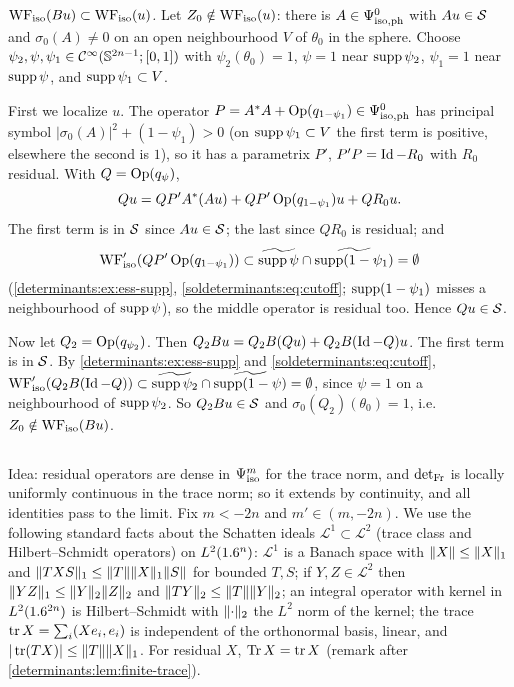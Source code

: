 \emph{$\operatorname{WF}_{\mathrm{iso}}(Bu)\subset\operatorname{WF}_{\mathrm{iso}}(u)$.} Let $Z_0\notin\operatorname{WF}_{\mathrm{iso}}(u)$: there is $A\in\Psi^{0}_{\mathrm{iso,ph}}$ with $Au\in\mathcal{S}$ and
$\sigma_0(A)\ne0$ on an open neighbourhood $V$ of $\theta_0$ in the sphere. Choose
$\psi_2,\psi,\psi_1\in\mathcal{C}^\infty(\mathbb{S}^{2n-1};[0,1])$ with $\psi_2(\theta_0)=1$, $\psi=1$ near $\operatorname{supp}\psi_2$,
$\psi_1=1$ near $\operatorname{supp}\psi$, and $\operatorname{supp}\psi_1\subset V$.

First we localize $u$. The operator $P=A^*A+\operatorname{Op}(q_{1-\psi_1})\in\Psi^{0}_{\mathrm{iso,ph}}$ has principal symbol
$|\sigma_0(A)|^2+(1-\psi_1)>0$ (on $\operatorname{supp}\psi_1\subset V$ the first term is positive, elsewhere the second is
$1$), so it has a parametrix $P'$, $P'P=\operatorname{Id}-R_0$ with $R_0$ residual. With $Q=\operatorname{Op}(q_\psi)$,
\begin{equation*}
  Qu=QP'A^*(Au)+QP'\operatorname{Op}(q_{1-\psi_1})u+QR_0u .
\end{equation*}
The first term is in $\mathcal{S}$ since $Au\in\mathcal{S}$; the last since $QR_0$ is residual; and
\begin{equation*}
  \operatorname{WF}_{\mathrm{iso}}'(QP'\operatorname{Op}(q_{1-\psi_1}))\subset\widetilde{\operatorname{supp}\psi}\cap\widetilde{\operatorname{supp}(1-\psi_1)}=\emptyset
\end{equation*}
(\cref{determinants:ex:ess-supp}, \eqref{soldeterminants:eq:cutoff}; $\operatorname{supp}(1-\psi_1)$ misses a neighbourhood of
$\operatorname{supp}\psi$), so the middle operator is residual too. Hence $Qu\in\mathcal{S}$.

Now let $Q_2=\operatorname{Op}(q_{\psi_2})$. Then $Q_2Bu=Q_2B(Qu)+Q_2B(\operatorname{Id}-Q)u$. The first term is in $\mathcal{S}$. By
\cref{determinants:ex:ess-supp} and \eqref{soldeterminants:eq:cutoff},
$\operatorname{WF}_{\mathrm{iso}}'(Q_2B(\operatorname{Id}-Q))\subset\widetilde{\operatorname{supp}\psi_2}\cap\widetilde{\operatorname{supp}(1-\psi)}=\emptyset$, since $\psi=1$
on a neighbourhood of $\operatorname{supp}\psi_2$. So $Q_2Bu\in\mathcal{S}$ and $\sigma_0(Q_2)(\theta_0)=1$, i.e.\
$Z_0\notin\operatorname{WF}_{\mathrm{iso}}(Bu)$.

\subsection*{\Cref{determinants:ex:extend}}
Idea: residual operators are dense in $\Psi^{m}_{\mathrm{iso}}$ for the trace norm, and $\operatorname{det}_{\mathrm{Fr}}$ is locally
uniformly continuous in the trace norm; so it extends by continuity, and all identities pass to the
limit. Fix $m<-2n$ and $m'\in(m,-2n)$. We use the following standard facts about the Schatten ideals
$\mathcal L^1\subset\mathcal L^2$ (trace class and Hilbert--Schmidt operators) on $L^2(1.6^n)$:
$\mathcal L^1$ is a Banach space with $\lVert X\rVert\le\lVert X\rVert_1$ and
$\lVert TXS\rVert_1\le\lVert T\rVert\lVert X\rVert_1\lVert S\rVert$ for bounded $T,S$; if $Y,Z\in\mathcal L^2$ then
$\lVert YZ\rVert_1\le\lVert Y\rVert_2\lVert Z\rVert_2$ and $\lVert TY\rVert_2\le\lVert T\rVert\lVert Y\rVert_2$; an integral operator with
kernel in $L^2(1.6^{2n})$ is Hilbert--Schmidt with $\lVert \cdot\rVert_2$ the $L^2$ norm of the kernel; the trace
$\operatorname{tr} X=\sum_i(Xe_i,e_i)$ is independent of the orthonormal basis, linear, and
$|\operatorname{tr}(TX)|\le\lVert T\rVert\lVert X\rVert_1$. For residual $X$, $\operatorname{Tr} X=\operatorname{tr} X$ (remark after
\cref{determinants:lem:finite-trace}).

